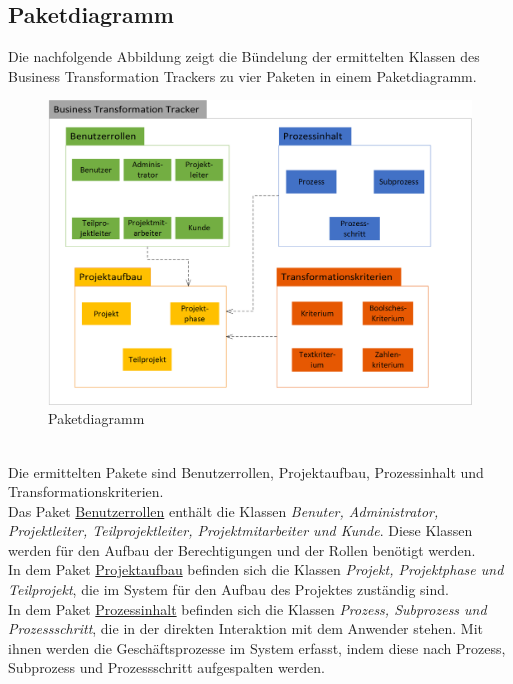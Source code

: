 \subsection{Paketdiagramm}
Die nachfolgende Abbildung zeigt die Bündelung der ermittelten Klassen des Business Transformation Trackers zu vier Paketen in einem Paketdiagramm.\\
\begin{figure}[h!]
    \centering
    \includegraphics[scale=0.8]{./Bilder/Paketdiagramm.png}
    \caption[Paketdiagramm]{Paketdiagramm}
    \label{fig:Paketdiagramm}
\end{figure}
\\Die ermittelten Pakete sind \glqq{}Benutzerrollen\grqq{}, \glqq{}Projektaufbau\grqq{}, \glqq{}Prozessinhalt\grqq{} und \glqq{}Transformationskriterien\grqq{}. 
\vspace{1em}
\\Das Paket \underline{Benutzerrollen} enthält die Klassen \emph{Benuter, Administrator, Projektleiter, Teilprojektleiter, Projektmitarbeiter und Kunde}. Diese Klassen werden für den Aufbau der Berechtigungen und der Rollen benötigt werden. 
\vspace{1em}
\\In dem Paket \underline{Projektaufbau} befinden sich die Klassen \emph{Projekt, Projektphase und Teilprojekt}, die im System für den Aufbau des Projektes zuständig sind. 
\vspace{1em}
\\In dem Paket \underline{Prozessinhalt} befinden sich die Klassen \emph{Prozess, Subprozess und Prozessschritt}, die in der direkten Interaktion mit dem Anwender stehen. Mit ihnen werden die Geschäftsprozesse im System erfasst, indem diese nach Prozess, Subprozess und Prozessschritt aufgespalten werden. 
